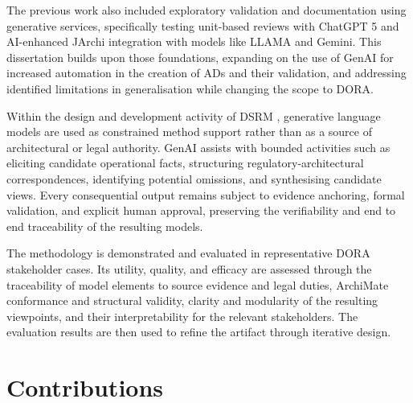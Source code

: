 The previous work also included exploratory validation and documentation using generative services, specifically testing unit-based reviews with ChatGPT 5 and AI-enhanced JArchi integration with models like LLAMA and Gemini. This dissertation builds upon those foundations, expanding on the use of \ac{GenAI} for increased automation in the creation of \ac{AD}s and their validation, and addressing identified limitations in generalisation while changing the scope to \ac{DORA}.



Within the design and development activity of \ac{DSRM} \cite{PeffersEtAl2007}, generative language models are used as constrained method support rather than as a source of architectural or legal authority. GenAI assists with bounded activities such as eliciting candidate operational facts, structuring regulatory-architectural correspondences, identifying potential omissions, and synthesising candidate views. Every consequential output remains subject to evidence anchoring, formal validation, and explicit human approval, preserving the verifiability and end to end traceability of the resulting models.

The methodology is demonstrated and evaluated in representative \ac{DORA} stakeholder cases. Its utility, quality, and efficacy are assessed through the traceability of model elements to source evidence and legal duties, ArchiMate conformance and structural validity, clarity and modularity of the resulting viewpoints, and their interpretability for the relevant stakeholders. The evaluation results are then used to refine the artifact through iterative design.

\section{Contributions}

